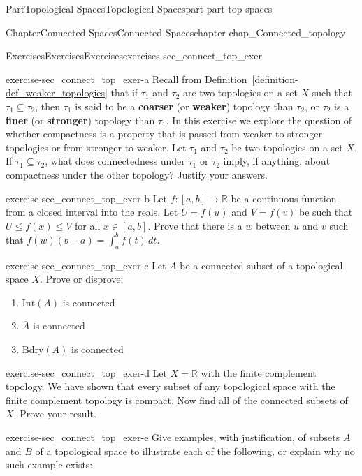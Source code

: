 \documentclass[oneside,10pt,]{book}
\newcommand{\xreffont}{\relax}
\newcommand{\terminology}[1]{\textbf{#1}}
\numberwithin{equation}{chapter}
\newcommand{\R}{\mathbb{R}}
\newcommand{\Int}{\text{Int}}
\newcommand{\Bdry}{\text{Bdry}}
\begin{document}
\begin{partptx}{Part}{Topological Spaces}{}{Topological Spaces}{}{}{part-part-top-spaces}
\begin{chapterptx}{Chapter}{Connected Spaces}{}{Connected Spaces}{}{}{chapter-chap_Connected_topology}
\begin{exercises-section}{Exercises}{Exercises}{}{Exercises}{}{}{exercises-sec_connect_top_exer}
\begin{divisionexercise}{1}{}{}{exercise-sec_connect_top_exer-a}%
Recall from \hyperref[definition-def_weaker_topologies]{Definition~{\xreffont\ref{definition-def_weaker_topologies}}} that if \(\tau_1\) and \(\tau_2\) are two topologies on a set \(X\) such that \(\tau_1 \subseteq \tau_2\), then \(\tau_1\) is said to be a \terminology{coarser} (or \terminology{weaker}) topology than \(\tau_2\), or \(\tau_2\) is a \terminology{finer} (or \terminology{stronger}) topology than \(\tau_1\). In this exercise we explore the question of whether compactness is a property that is passed from weaker to stronger topologies or from stronger to weaker. Let \(\tau_1\) and \(\tau_2\) be two topologies on a set \(X\). If \(\tau_1 \subseteq \tau_2\), what does connectedness under \(\tau_1\) or \(\tau_2\) imply, if anything, about compactness under the other topology? Justify your answers.%
\end{divisionexercise}%
\begin{divisionexercise}{2}{}{}{exercise-sec_connect_top_exer-b}%
Let \(f: [a,b] \to \R\) be a continuous function from a closed interval into the reals. Let \(U = f(u)\) and \(V = f(v)\) be such that \(U \leq f(x) \leq V\) for all \(x \in [a,b]\). Prove that there is a \(w\) between \(u\) and \(v\) such that \(f(w)(b-a) = \int_a^b f(t) \, dt\).%
\end{divisionexercise}%
\begin{divisionexercise}{3}{}{}{exercise-sec_connect_top_exer-c}%
Let \(A\) be a connected subset of a topological space \(X\). Prove or disprove:%
\begin{enumerate}[font=\bfseries,label=(\alph*),ref=\alph*]%
\item{}\(\Int(A)\) is connected%
\item{}\(\overline{A}\) is connected%
\item{}\(\Bdry(A)\) is connected%
\end{enumerate}%
\end{divisionexercise}%
\begin{divisionexercise}{4}{}{}{exercise-sec_connect_top_exer-d}%
Let \(X = \R\) with the finite complement topology. We have shown that every subset of any topological space with the finite complement topology is compact. Now find all of the connected subsets of \(X\). Prove your result.%
\end{divisionexercise}%
\begin{divisionexercise}{5}{}{}{exercise-sec_connect_top_exer-e}%
Give examples, with justification, of subsets \(A\) and \(B\) of a topological space to illustrate each of the following, or explain why no such example exists:%

\end{divisionexercise}
\end{exercises-section}
\end{chapterptx}
\end{partptx}
\end{document}
